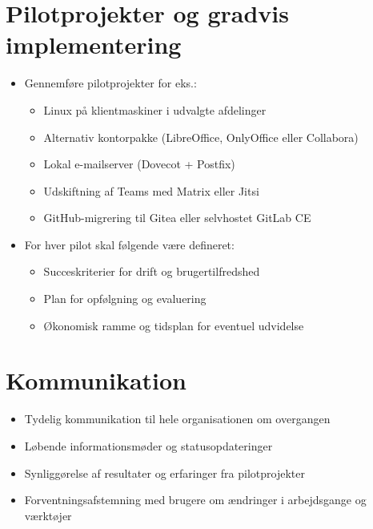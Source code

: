 \documentclass[a4paper,11pt]{book}
\begin{document}
\section{Pilotprojekter og gradvis
implementering}\label{pilotprojekter-og-gradvis-implementering}

\begin{itemize}
\item
  Gennemføre pilotprojekter for eks.:

  \begin{itemize}
  \tightlist
  \item
    Linux på klientmaskiner i udvalgte afdelinger
  \item
    Alternativ kontorpakke (LibreOffice, OnlyOffice eller Collabora)
  \item
    Lokal e-mailserver (Dovecot + Postfix)
  \item
    Udskiftning af Teams med Matrix eller Jitsi
  \item
    GitHub-migrering til Gitea eller selvhostet GitLab CE
  \end{itemize}
\item
  For hver pilot skal følgende være defineret:

  \begin{itemize}
  \tightlist
  \item
    Succeskriterier for drift og brugertilfredshed
  \item
    Plan for opfølgning og evaluering
  \item
    Økonomisk ramme og tidsplan for eventuel udvidelse
  \end{itemize}
\end{itemize}

\section{Kommunikation}\label{kommunikation}

\begin{itemize}
\tightlist
\item
  Tydelig kommunikation til hele organisationen om overgangen
\item
  Løbende informationsmøder og statusopdateringer
\item
  Synliggørelse af resultater og erfaringer fra pilotprojekter
\item
  Forventningsafstemning med brugere om ændringer i arbejdsgange og
  værktøjer
\end{itemize}
\end{document}
